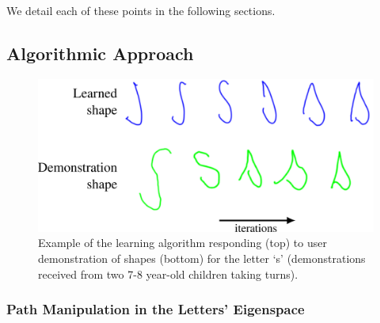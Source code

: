 \documentclass{article}
\begin{document}
We detail each of these points in the following sections.

\subsection{Algorithmic Approach}

\begin{figure}[thpb]
    \centering
    \includegraphics[width=0.6\columnwidth]{learningSdemo}
    \caption{\label{fig:demonstrationShapes2}Example of the learning algorithm
    responding (top) to user demonstration of shapes (bottom) for the letter `s'
    (demonstrations received from two 7-8 year-old children taking turns).}

\end{figure}


\subsubsection{Path Manipulation in the Letters' Eigenspace}
\end{document}
